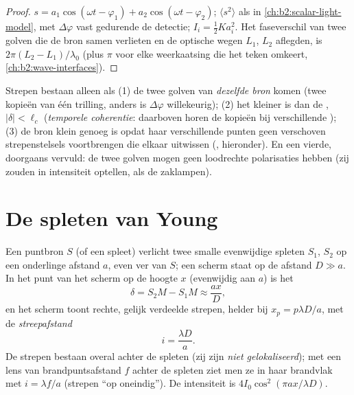 \begin{proof}
$s = a_1\cos(\omega t - \varphi_1) + a_2\cos(\omega t - \varphi_2)$;
$\langle s^2\rangle$ als in
\cref{ch:b2:scalar-light-model}, met $\Delta\varphi$ vast gedurende de
detectie; $I_i = \tfrac12Ka_i^2$. Het faseverschil van twee golven die
de bron samen verlieten en de optische wegen $L_1$, $L_2$ aflegden, is
$2\pi(L_2 - L_1)/\lambda_0$ (plus $\pi$ voor elke weerkaatsing die het teken
omkeert, \cref{ch:b2:wave-interfaces}).
\end{proof}

\begin{remark}\label{rem:b2:two-wave-interference:conditions}
Strepen bestaan alleen als (1) de twee golven van \emph{dezelfde bron}
komen (twee kopieën van één trilling, anders is $\Delta\varphi$ willekeurig);
(2) het  kleiner is dan de , $|\delta| < \ell_c$
(\emph{temporele coherentie}: daarboven horen de kopieën bij
verschillende ); (3) de bron klein genoeg is opdat haar
verschillende punten geen verschoven strepenstelsels voortbrengen die
elkaar uitwissen (\emph{}, hieronder). En een
vierde, doorgaans vervuld: de twee golven mogen geen loodrechte
polarisaties hebben (zij zouden in intensiteit optellen, als de zaklampen).
\end{remark}

\section{De spleten van Young}

\begin{proposition}\label{prop:b2:two-wave-interference:young}
Een puntbron $S$ (of een spleet) verlicht twee smalle evenwijdige
spleten $S_1$, $S_2$ op een onderlinge afstand $a$, even ver van $S$; een
scherm staat op de afstand $D \gg a$. In het punt van het scherm op de
hoogte $x$ (evenwijdig aan $a$) is het 
\[
\delta = S_2M - S_1M \approx \frac{ax}D ,
\]
en het scherm toont rechte, gelijk verdeelde strepen, helder bij
$x_p =
p\lambda D/a$, met de \emph{streepafstand}
\[
i = \frac{\lambda D}a .
\]
De strepen bestaan overal achter de spleten (zij zijn \emph{niet
gelokaliseerd}); met een lens van brandpuntsafstand $f$ achter de
spleten ziet men ze in haar brandvlak met $i = \lambda f/a$ (strepen ``op
oneindig''). De intensiteit is $4I_0\cos^2(\pi ax/\lambda D)$.
\end{proposition}


